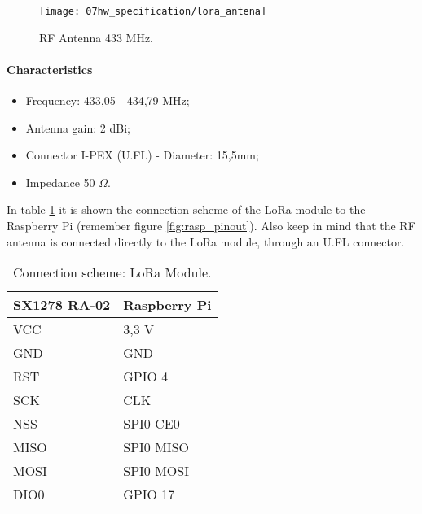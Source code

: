 
\begin{figure}[H]
	\centering
	\texttt{[image: 07hw\_specification/lora\_antena]}
	\caption{RF Antenna 433 MHz.}
	\label{fig:lora_antena}
\end{figure}

\paragraph*{Characteristics}
\begin{itemize}
	\item Frequency: 433,05 - 434,79 MHz;
	\item Antenna gain: 2 dBi;
	\item Connector I-PEX (U.FL) - Diameter: 15,5mm;
	\item Impedance 50 $\Omega$.
\end{itemize}

In table \ref{table:connect_lora} it is shown the connection scheme of the LoRa module to the Raspberry Pi (remember figure \ref{fig:rasp_pinout}). Also keep in mind that the RF antenna is connected directly to the LoRa module, through an U.FL connector.

\begin{table}[H]
	\centering
	\begin{tabular}{|m{5cm}|m{6cm}|}
		\hline
		\textbf{SX1278 RA-02} & \textbf{Raspberry Pi}
		\\\hline\hline
		
		VCC & 3,3 V
		\\\hline
		GND & GND
		\\\hline
		RST & GPIO 4
		\\\hline
		SCK & CLK
		\\\hline
		NSS & SPI0 CE0
		\\\hline
		MISO & SPI0 MISO
		\\\hline
		MOSI & SPI0 MOSI
		\\\hline
		DIO0 & GPIO 17
		\\\hline
	\end{tabular}
	
	\caption{Connection scheme: LoRa Module.}
	\label{table:connect_lora}
\end{table}


